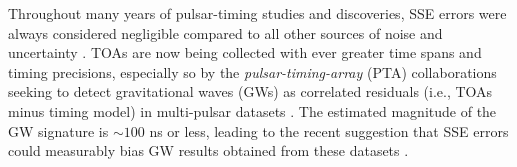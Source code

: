 \documentclass[iop,apj,twocolappendix]{emulateapj}
\begin{document}
Throughout many years of pulsar-timing studies and discoveries, SSE errors were always considered negligible compared to all other sources of noise and uncertainty \citep{1990ApJ...361..300F,2006MNRAS.372.1549E}.
TOAs are now being collected with ever greater time spans and timing precisions, especially so by the \emph{pulsar-timing-array} (PTA) collaborations seeking to detect gravitational waves (GWs) as correlated residuals (i.e., TOAs minus timing model) in multi-pulsar datasets \citep{saz78,det79,fb90,ml13,dcl+16,h13,v+16}.
The estimated magnitude of the GW signature is $\sim 100$ ns or less, leading to the recent suggestion that SSE errors could measurably bias GW results obtained from these datasets \citep{2016MNRAS.455.4339T,2019ApJ...876...55R}.
%
\end{document}
